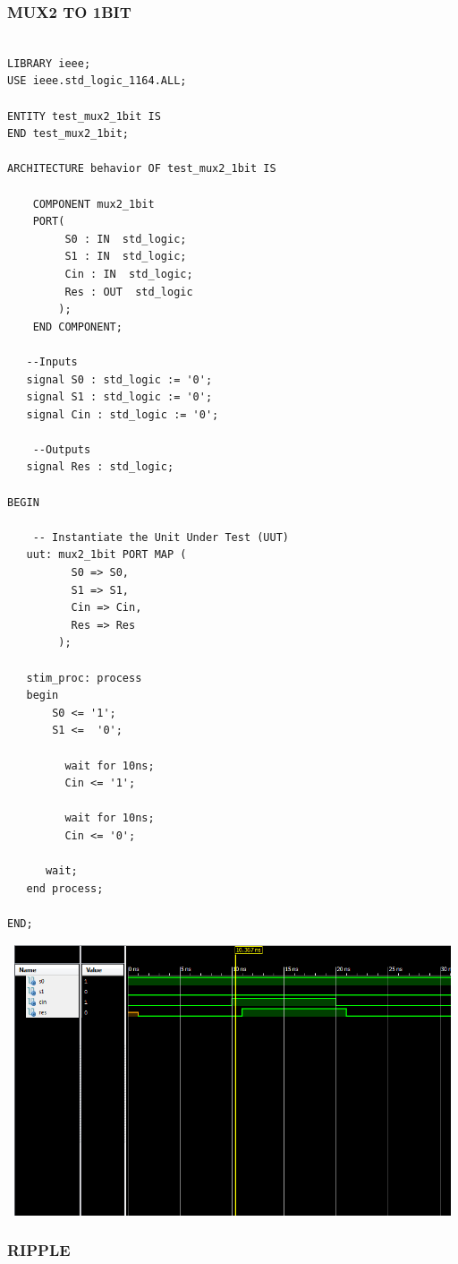 \documentclass{article}
\begin{document}
\subsubsection{MUX2 TO 1BIT}\label{sec:result}

\begin{lstlisting}

LIBRARY ieee;
USE ieee.std_logic_1164.ALL;

ENTITY test_mux2_1bit IS
END test_mux2_1bit;
 
ARCHITECTURE behavior OF test_mux2_1bit IS 

    COMPONENT mux2_1bit
    PORT(
         S0 : IN  std_logic;
         S1 : IN  std_logic;
         Cin : IN  std_logic;
         Res : OUT  std_logic
        );
    END COMPONENT;
    
   --Inputs
   signal S0 : std_logic := '0';
   signal S1 : std_logic := '0';
   signal Cin : std_logic := '0';

 	--Outputs
   signal Res : std_logic;

BEGIN
 
	-- Instantiate the Unit Under Test (UUT)
   uut: mux2_1bit PORT MAP (
          S0 => S0,
          S1 => S1,
          Cin => Cin,
          Res => Res
        );

   stim_proc: process
   begin		
       S0 <= '1';
       S1 <=  '0';
		 
		 wait for 10ns;
		 Cin <= '1';
		 
		 wait for 10ns;
		 Cin <= '0';

      wait;
   end process;

END;
\end{lstlisting}
\includegraphics[width=16cm, height=8cm]{test_mux2.png}
\pagebreak


\subsubsection{RIPPLE}\label{sec:result}
\end{document}
